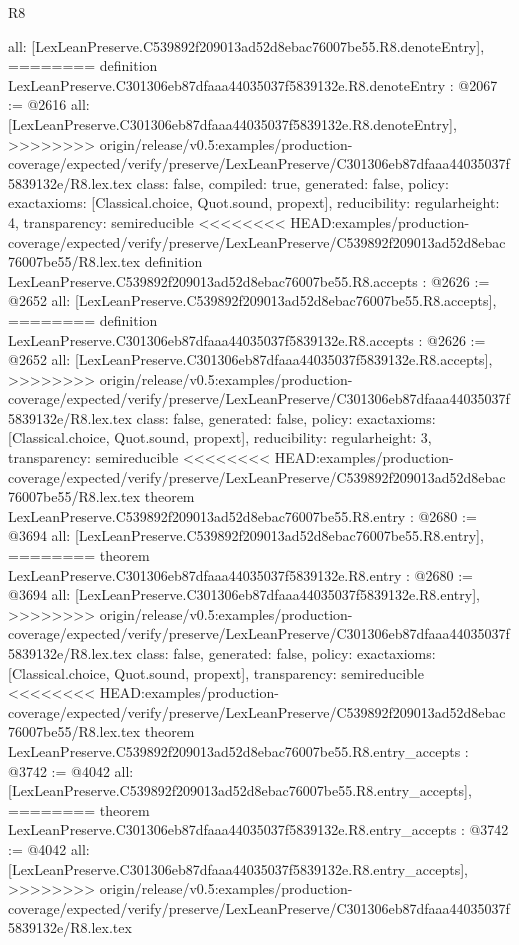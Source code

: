 \begin{lexlean}{R8}
\begin{coremodule}
{{{{{{{{{{{{{{{{{{{{{{{{{{{{{{{{{{{{  all: [LexLeanPreserve.C539892f209013ad52d8ebac76007be55.R8.denoteEntry],
========
definition LexLeanPreserve.C301306eb87dfaaa44035037f5839132e.R8.denoteEntry : @2067 := @2616 {
  all: [LexLeanPreserve.C301306eb87dfaaa44035037f5839132e.R8.denoteEntry],
>>>>>>>> origin/release/v0.5:examples/production-coverage/expected/verify/preserve/LexLeanPreserve/C301306eb87dfaaa44035037f5839132e/R8.lex.tex
  class: false,
  compiled: true,
  generated: false,
  policy: exact{axioms: [Classical.choice, Quot.sound, propext]},
  reducibility: regular{height: 4},
  transparency: semireducible
}
<<<<<<<< HEAD:examples/production-coverage/expected/verify/preserve/LexLeanPreserve/C539892f209013ad52d8ebac76007be55/R8.lex.tex
definition LexLeanPreserve.C539892f209013ad52d8ebac76007be55.R8.accepts : @2626 := @2652 {
  all: [LexLeanPreserve.C539892f209013ad52d8ebac76007be55.R8.accepts],
========
definition LexLeanPreserve.C301306eb87dfaaa44035037f5839132e.R8.accepts : @2626 := @2652 {
  all: [LexLeanPreserve.C301306eb87dfaaa44035037f5839132e.R8.accepts],
>>>>>>>> origin/release/v0.5:examples/production-coverage/expected/verify/preserve/LexLeanPreserve/C301306eb87dfaaa44035037f5839132e/R8.lex.tex
  class: false,
  generated: false,
  policy: exact{axioms: [Classical.choice, Quot.sound, propext]},
  reducibility: regular{height: 3},
  transparency: semireducible
}
<<<<<<<< HEAD:examples/production-coverage/expected/verify/preserve/LexLeanPreserve/C539892f209013ad52d8ebac76007be55/R8.lex.tex
theorem LexLeanPreserve.C539892f209013ad52d8ebac76007be55.R8.entry : @2680 := @3694 {
  all: [LexLeanPreserve.C539892f209013ad52d8ebac76007be55.R8.entry],
========
theorem LexLeanPreserve.C301306eb87dfaaa44035037f5839132e.R8.entry : @2680 := @3694 {
  all: [LexLeanPreserve.C301306eb87dfaaa44035037f5839132e.R8.entry],
>>>>>>>> origin/release/v0.5:examples/production-coverage/expected/verify/preserve/LexLeanPreserve/C301306eb87dfaaa44035037f5839132e/R8.lex.tex
  class: false,
  generated: false,
  policy: exact{axioms: [Classical.choice, Quot.sound, propext]},
  transparency: semireducible
}
<<<<<<<< HEAD:examples/production-coverage/expected/verify/preserve/LexLeanPreserve/C539892f209013ad52d8ebac76007be55/R8.lex.tex
theorem LexLeanPreserve.C539892f209013ad52d8ebac76007be55.R8.entry_accepts : @3742 := @4042 {
  all: [LexLeanPreserve.C539892f209013ad52d8ebac76007be55.R8.entry_accepts],
========
theorem LexLeanPreserve.C301306eb87dfaaa44035037f5839132e.R8.entry_accepts : @3742 := @4042 {
  all: [LexLeanPreserve.C301306eb87dfaaa44035037f5839132e.R8.entry_accepts],
>>>>>>>> origin/release/v0.5:examples/production-coverage/expected/verify/preserve/LexLeanPreserve/C301306eb87dfaaa44035037f5839132e/R8.lex.tex
}}}}}}}}}}}}}}}}}}}}}}}}}}}}}}}}}}}}}}}}
\end{coremodule}
\end{lexlean}
